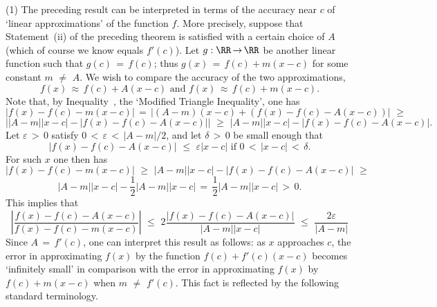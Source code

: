 \hspace*{\parindent}(1) The preceding result can be interpreted in terms of the accuracy near $c$ of `linear approximations' of the function $f$.
    More precisely, suppose that Statement~(ii) of the preceding theorem is satisfied with a certain choice of $A$ (which of course we know equals $f'(c)$).
    Let $g:{\RR} \,{\rightarrow}\, {\RR}$ be another linear function such that $g(c) \,=\, f(c)$; thus $g(x) \,=\, f(c) + m(x-c)$ for some constant $m \,\,{\neq}\,\, A$.
    We wish to compare the accuracy of the two approximations,
        \begin{displaymath}
        f(x) \,{\approx}\, f(c) + A(x-c) \mbox{ and } f(x) \,{\approx}\, f(c) + m(x-c).
        \end{displaymath}
    Note that, by Inequality~, the `Modified Triangle Inequality', one has
        \begin{displaymath}
        |f(x)-f(c)-m(x-c)| \,=\, |(A-m)(x-c) + (f(x)-f(c)-A(x-c))|\,\,{\geq}\,\,
        \end{displaymath}
        \begin{displaymath}
        \left||A-m||x-c| - |f(x)-f(c)-A(x-c)|\right|\,\,{\geq}\,\,|A-m||x-c| - |f(x)-f(c)-A(x-c)|.
        \end{displaymath}
    Let ${\varepsilon}\,>\,0$ satisfy $0\,<\,{\varepsilon}\,<\,|A-m|/2$, and let ${\delta}\,>\,0$ be small enough that
        \begin{displaymath}
        |f(x) - f(c) - A(x-c)|\,\,{\leq}\,\,{\varepsilon}|x-c| \mbox{ if $0\,<\,|x-c|\,<\,{\delta}$}.
        \end{displaymath}
    For such $x$ one then has
        \begin{displaymath}
        |f(x)-f(c)-m(x-c)|\,\,{\geq}\,\,|A-m||x-c| - |f(x)-f(c)-A(x-c)|\,\,{\geq}\,\,
        \end{displaymath}
        \begin{displaymath}
|A-m||x-c| - \frac{1}{2}|A-m||x-c| \,=\, \frac{1}{2}|A-m||x-c|\,>\,0.
        \end{displaymath}
    This implies that
        \begin{displaymath}
        \left|\frac{f(x)-f(c)-A(x-c)}{f(x)-f(c)-m(x-c)}\right|\,\,{\leq}\,\,2\frac{|f(x)-f(c)-A(x-c)|}{|A-m||x-c|}\,\,{\leq}\,\,\frac{2{\varepsilon}}{|A-m|}
        \end{displaymath}
    Since $A \,=\, f'(c)$, one can interpret this result as follows: as $x$ approaches $c$,
    the error in approximating $f(x)$ by the function $f(c) + f'(c)(x-c)$ becomes `infinitely small'
    in comparison with the error in approximating $f(x)$ by $f(c) + m(x-c)$ when $m \,\,{\neq}\,\, f'(c)$.
    This fact is reflected by the following standard terminology.

